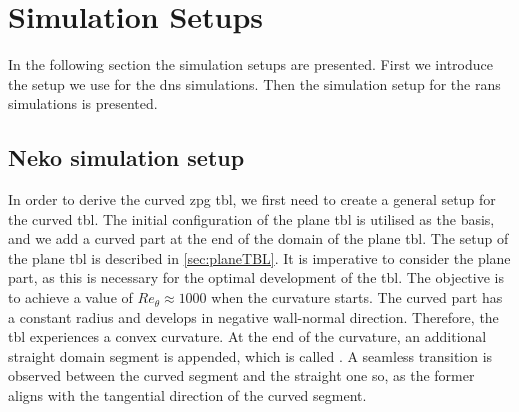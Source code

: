 






 



\section{Simulation Setups}\label{sec:MethodCurvedTBL}

In the following section the simulation setups are presented.
First we introduce the setup we use for the \acrshort{dns} simulations.
Then the simulation setup for the \acrshort{rans} simulations is presented.

\subsection{Neko simulation setup}

In order to derive the curved \acrshort{zpg} \acrshort{tbl}, we first need to create a general setup for the curved \acrshort{tbl}. 
The initial configuration of the plane  \acrshort{tbl} is utilised as the basis, and we add a curved part at the end of the domain of the plane \acrshort{tbl}. 
The setup of the plane \acrshort{tbl} is described in \autoref{sec:planeTBL}.
It is imperative to consider the plane part, as this is necessary for the optimal development of the \acrshort{tbl}. The objective is to achieve
a value of $Re_{\theta} \approx 1000$ when the curvature starts. 
The curved part has a constant radius and develops in negative wall-normal direction. 
Therefore, the \acrshort{tbl} experiences a convex curvature. 
At the end of the curvature, an additional straight domain segment is appended, which is called .
A seamless transition is observed between the curved segment and the straight one \acrlong{so}, as the former aligns with the tangential direction of the curved segment. 

